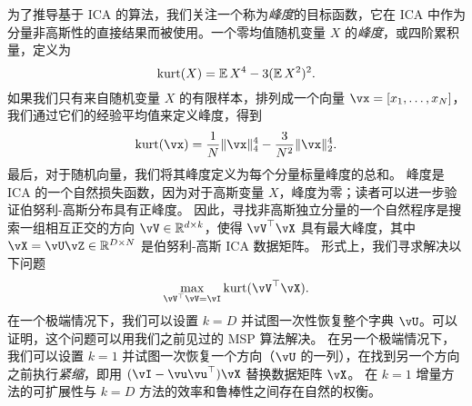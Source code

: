 \documentclass[../../book-main.tex]{subfiles}
\begin{document}
为了推导基于 ICA 的算法，我们关注一个称为\textit{峰度}的目标函数，它在 ICA 中作为分量非高斯性的直接结果而被使用。一个零均值随机变量 $X$ 的\textit{峰度}，或四阶累积量，定义为
\begin{equation}\label{eq:kurtosis}
\mathop{\mathrm{kurt}}(X) = \operatorname{\mathbb{E}}{X^4} - 3 (\operatorname{\mathbb{E}}{X^2})^2.
\end{equation}
如果我们只有来自随机变量 $X$ 的有限样本，排列成一个向量 $\vx = [x_1, \dots, x_N]$，我们通过它们的经验平均值来定义峰度，得到
\begin{equation}\label{eq:kurtosis-vector}
\kurt(\vx) = \frac{1}{N} \norm{\vx}_4^4 - \frac{3}{N^2} \norm{\vx}_2^4.
\end{equation}
最后，对于随机向量，我们将其峰度定义为每个分量标量峰度的总和。
峰度是 ICA 的一个自然损失函数，因为对于高斯变量 $X$，峰度为零；读者可以进一步验证伯努利-高斯分布具有正峰度。
因此，寻找非高斯独立分量的一个自然程序是搜索一组相互正交的方向 $\vV \in \R^{d \times k}$，使得 $\vV^\top \vX$ 具有最大峰度，其中 $\vX = \vU \vZ \in \R^{D \times N}$ 是伯努利-高斯 ICA 数据矩阵。
形式上，我们寻求解决以下问题
\begin{equation}
    \max_{\vV^\top \vV = \vI} \kurt(\vV^\top \vX).
\end{equation}
在一个极端情况下，我们可以设置 $k = D$ 并试图一次性恢复整个字典 $\vU$。可以证明，这个问题可以用我们之前见过的 MSP 算法解决。
在另一个极端情况下，我们可以设置 $k=1$ 并试图一次恢复一个方向（$\vU$ 的一列），在找到另一个方向之前执行\textit{紧缩}，即用 $(\vI - \vu\vu^\top) \vX$ 替换数据矩阵 $\vX$。
在 $k=1$ 增量方法的可扩展性与 $k=D$ 方法的效率和鲁棒性之间存在自然的权衡。
\end{document}

